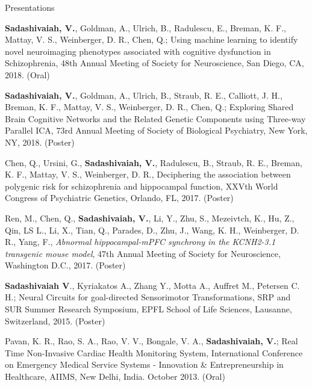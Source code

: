 \documentclass{resume}
\begin{document}
\begin{rSection}{Presentations}
\begin{presentations}
\item \textbf{Sadashivaiah, V.}, Goldman, A., Ulrich, B., Radulescu, E., Breman, K. F., Mattay, V. S., Weinberger, D. R., Chen, Q.; Using machine learning to identify novel neuroimaging phenotypes associated with cognitive dysfunction in Schizophrenia, 48th Annual Meeting of Society for Neuroscience, San Diego, CA, 2018. (Oral)

\item \textbf{Sadashivaiah, V.}, Goldman, A., Ulrich, B., Straub, R. E., Calliott, J. H., Breman, K. F., Mattay, V. S., Weinberger, D. R., Chen, Q.; Exploring Shared Brain Cognitive Networks and the Related Genetic Components using Three-way Parallel ICA, 73rd Annual Meeting of Society of Biological Psychiatry, New York, NY, 2018. (Poster) 

\item Chen, Q., Ursini, G., \textbf{Sadashivaiah, V.}, Radulescu, B., Straub, R. E., Breman, K. F., Mattay, V. S., Weinberger, D. R.,  Deciphering the association between polygenic risk for schizophrenia and hippocampal function, XXVth World Congress of Psychiatric Genetics, Orlando, FL, 2017. (Poster)

\item Ren, M., Chen, Q., \textbf{Sadashivaiah, V.}, Li, Y., Zhu, S., Mezeivtch, K., Hu, Z.,  Qin, LS L., Li, X., Tian, Q., Parades, D., Zhu, J., Wang, K. H., Weinberger, D. R., Yang, F., \textit{Abnormal hippocampal-mPFC synchrony in the KCNH2-3.1 transgenic mouse model}, 47th Annual Meeting of Society for Neuroscience, Washington D.C., 2017. (Poster)

\item \textbf{Sadashivaiah V}.,  Kyriakatos A.,  Zhang Y.,  Motta A.,  Auffret M.,  Petersen C. H.; Neural Circuits for goal-directed Sensorimotor Transformations, SRP and SUR Summer Research Symposium, EPFL School of Life Sciences, Lausanne, Switzerland, 2015. (Poster)

\item Pavan, K. R., Rao, S. A., Rao, V. V., Bongale, V. A., \textbf{Sadashivaiah, V.}; Real Time Non-Invasive Cardiac Health Monitoring System,  International Conference on Emergency Medical Service Systems - Innovation \& Entrepreneurship in Healthcare, AIIMS, New Delhi, India. October 2013. (Oral)
\end{presentations}
\end{rSection} 
\end{document}
